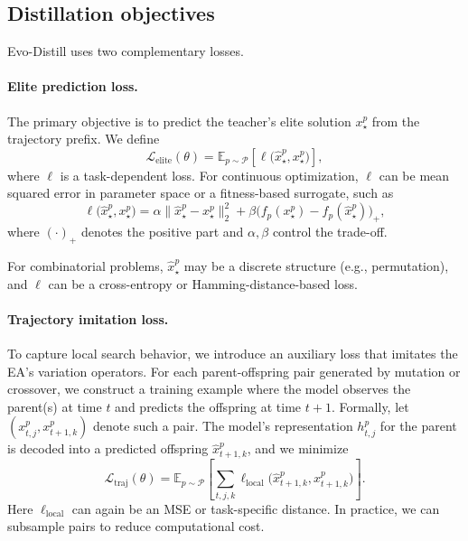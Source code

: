 \documentclass{article}
\begin{document}
\subsection{Distillation objectives}

Evo-Distill uses two complementary losses.

\paragraph{Elite prediction loss.}
The primary objective is to predict the teacher's elite solution $x_\star^p$ from the trajectory prefix. We define
\begin{equation}
    \mathcal{L}_{\text{elite}}(\theta) = \mathbb{E}_{p \sim \mathcal{P}} \left[ \ell\big(\hat{x}_\star^p, x_\star^p\big) \right],
\end{equation}
where $\ell$ is a task-dependent loss. For continuous optimization, $\ell$ can be mean squared error in parameter space or a fitness-based surrogate, such as
\begin{equation}
    \ell\big(\hat{x}_\star^p, x_\star^p\big) = \alpha \| \hat{x}_\star^p - x_\star^p \|_2^2 + \beta \big(f_p(x_\star^p) - f_p(\hat{x}_\star^p)\big)_+,
\end{equation}
where $(\cdot)_+$ denotes the positive part and $\alpha, \beta$ control the trade-off.

For combinatorial problems, $\hat{x}_\star^p$ may be a discrete structure (e.g., permutation), and $\ell$ can be a cross-entropy or Hamming-distance-based loss.

\paragraph{Trajectory imitation loss.}
To capture local search behavior, we introduce an auxiliary loss that imitates the EA's variation operators. For each parent-offspring pair generated by mutation or crossover, we construct a training example where the model observes the parent(s) at time $t$ and predicts the offspring at time $t+1$. Formally, let $(x_{t,j}^p, x_{t+1,k}^p)$ denote such a pair. The model's representation $h_{t,j}^p$ for the parent is decoded into a predicted offspring $\hat{x}_{t+1,k}^p$, and we minimize
\begin{equation}
    \mathcal{L}_{\text{traj}}(\theta) = \mathbb{E}_{p \sim \mathcal{P}} \left[ \sum_{t,j,k} \ell_{\text{local}}\big(\hat{x}_{t+1,k}^p, x_{t+1,k}^p\big) \right].
\end{equation}
Here $\ell_{\text{local}}$ can again be an MSE or task-specific distance. In practice, we can subsample pairs to reduce computational cost.
\end{document}
